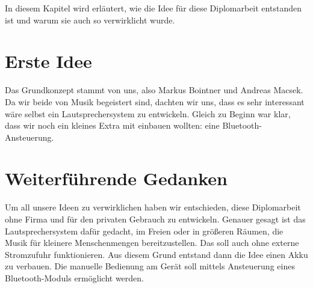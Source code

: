 In diesem Kapitel wird erläutert, wie die Idee für diese Diplomarbeit entstanden ist und warum sie auch so verwirklicht wurde.

\section{Erste Idee} \label{sec:1.1}
Das Grundkonzept stammt von uns, also Markus Bointner und Andreas Macsek. Da wir beide von Musik begeistert sind, dachten wir uns, dass es sehr interessant wäre selbst ein Lautsprechersystem zu entwickeln. Gleich zu Beginn war klar, dass wir noch ein kleines Extra mit einbauen wollten: eine Bluetooth-Ansteuerung.

\section{Weiterführende Gedanken} \label{sec:1.2}
Um all unsere Ideen zu verwirklichen haben wir entschieden, diese Diplomarbeit ohne Firma und für den privaten Gebrauch zu entwickeln. Genauer gesagt ist das Lautsprechersystem dafür gedacht, im Freien oder in größeren Räumen, die Musik für kleinere Menschenmengen bereitzustellen. Das soll auch ohne externe Stromzufuhr funktionieren. Aus diesem Grund entstand dann die Idee einen Akku zu verbauen. Die manuelle Bedienung am Gerät soll mittels Ansteuerung eines Bluetooth-Moduls ermöglicht werden.
